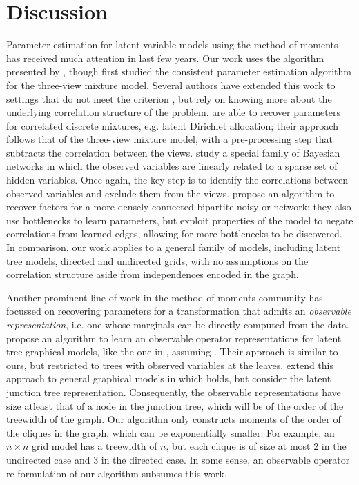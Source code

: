 \section{Discussion}
\label{sec:discussion}

Parameter estimation for latent-variable models using the method of
  moments has received much attention in last few years.
Our work uses the \TensorFactorize algorithm presented by
  \citet{anandkumar13tensor}, though \citet{anandkumar12moments} first
  studied the consistent parameter estimation algorithm for the
  three-view mixture model.
Several authors have extended this work to settings that do not meet the
  criterion , but rely on knowing more about
  the underlying correlation structure of the problem.
\citet{anandkumar12lda} are able to recover parameters for correlated
  discrete mixtures, e.g. latent Dirichlet allocation; their approach
  follows that of the three-view mixture model, with a pre-processing step
  that subtracts the correlation between the views.
\citet{anandkumar2013linear} study a special family of Bayesian networks
  in which the observed variables are linearly related to a sparse set of
  hidden variables. Once again, the key step is to identify the
  correlations between observed variables and exclude them from the views.
\citet{halpern13noisyor} propose an algorithm to recover factors for
  a more densely connected bipartite noisy-or network; they also use
  bottlenecks to learn parameters, but exploit properties of the model
  to negate correlations from learned edges, allowing for more
  bottlenecks to be discovered. 
In comparison, our work applies to a general family of models, including
  latent tree models, directed and undirected grids, with no assumptions
  on the correlation structure aside from independences encoded in the
  graph. 

Another prominent line of work in the method of moments community has
  focussed on recovering parameters for a transformation that admits an {\em observable
  representation}, i.e. one whose marginals can be directly computed from the data.
\citet{song2011spectral} propose an algorithm to learn an observable
  operator representations for latent tree graphical models, like the
  one in , assuming . 
Their approach is similar to ours, but restricted to trees with observed
  variables at the leaves.
\citet{parikh12spectral} extend this approach to general graphical
  models in which  holds, but consider the latent
  junction tree representation. 
Consequently, the observable representations have size atleast that of
  a node in the junction tree, which will be of the order of the treewidth
  of the graph. 
Our algorithm only constructs moments of the order of the cliques in the
  graph, which can be exponentially smaller. 
For example, an $n\times n$ grid model has a treewidth of $n$, but each
  clique is of size at most $2$ in the undirected case and $3$ in the
  directed case.
In some sense, an observable operator re-formulation of our algorithm
  subsumes this work.

